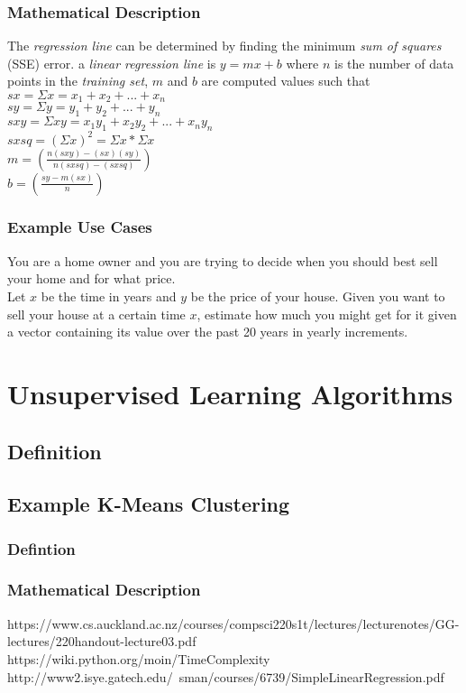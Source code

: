 \documentclass[a4paper]{article}
\begin{document}
\subsubsection{Mathematical Description}
The \textit{regression line} can be determined by finding the minimum \textit{sum of squares} (SSE) error. 
a \textit{linear regression line} is $y=mx+b$ where $n$ is the number of data points in the \textit{training set}, $m$ and $b$ are computed values such that \\ \linebreak
$sx = \Sigma x = x_1+x_2+...+x_n$\\
$sy = \Sigma y = y_1+y_2+...+y_n$\\
$sxy = \Sigma xy = x_1y_1+x_2y_2+...+x_ny_n $\\
$sxsq = \left(\Sigma x\right)^2 = \Sigma x * \Sigma x $\\
$m = \left(\frac{n(sxy)-(sx)(sy)}{n(sxsq)-(sxsq)}\right)$\\
$b = \left(\frac{sy-m(sx)}{n}\right)$
\cite{GATech}
\subsubsection{Example Use Cases}
You are a home owner and you are trying to decide when you should best sell your home and for what price.\\
Let $x$ be the time in years and $y$ be the price of your house. Given you want to sell your house at a certain time $x$, estimate how much you might get for it given a vector containing its value over the past 20 years in yearly increments. 
\section{Unsupervised Learning Algorithms}
\subsection{Definition}
\subsection{Example K-Means Clustering}
\subsubsection{Defintion}
\subsubsection{Mathematical Description}

\begin{thebibliography}{9}
https://www.cs.auckland.ac.nz/courses/compsci220s1t/lectures/lecturenotes/GG-lectures/220handout-lecture03.pdf
https://wiki.python.org/moin/TimeComplexity
http://www2.isye.gatech.edu/~sman/courses/6739/SimpleLinearRegression.pdf
\end{thebibliography}
\end{document}
